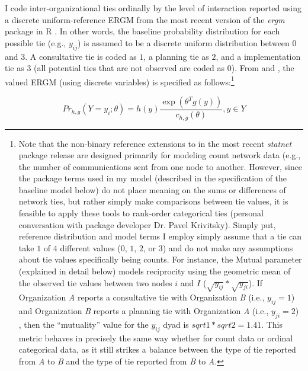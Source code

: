 \documentclass[12pt,a4paper,titlepage]{article}
\begin{document}
I code inter-organizational ties ordinally by the level of interaction reported using a discrete uniform-reference ERGM from the most recent version of the \textit{ergm} package in R \parencite{handcock2014}. In other words, the baseline probability distribution for each possible tie (e.g., $y_{ij}$) is assumed to be a discrete uniform distribution between $0$ and $3$. A consultative tie is coded as $1$, a planning tie as $2$, and a implementation tie as $3$ (all potential ties that are not observed are coded as $0$). From \textcite{krivitsky2012} and \textcite{handcock2014}, the valued ERGM (using discrete variables) is specified as follows:\footnote{Note that the non-binary reference extensions to in the most recent \textit{statnet} package release \parencite{handock2014-a} are designed primarily for modeling count network data (e.g., the number of communications sent from one node to another. However, since the package terms used in my model (described in the specification of the baseline model below) do not place meaning on the sums or differences of network ties, but rather simply make comparisons between tie values, it is feasible to apply these tools to rank-order categorical ties (personal conversation with package developer Dr. Pavel Krivitsky). Simply put, reference distribution and model terms I employ simply assume that a tie can take $1$ of $4$ different values ($0$, $1$, $2$, or $3$) and do not make any assumptions about tie values specifically being counts. For instance, the Mutual parameter (explained in detail below) models reciprocity using the geometric mean of the observed tie values between two nodes $i$ and $I$ ($\sqrt{y_{ij}}* \sqrt{y_{ji}}$). If Organization \textit{A} reports a consultative tie with Organization \textit{B} (i.e., $y_{ij} = 1$) and Organization \textit{B} reports a planning tie with Organization \textit{A} (i.e., $y_{ji} = 2$) , then the ``mutuality'' value for the $y_{ij}$ dyad is $sqrt{1} * sqrt{2} = 1.41$. This metric behaves in precisely the same way whether for count data or ordinal categorical data, as it still strikes a balance between the type of tie reported from \textit{A} to \textit{B} and the type of tie reported from \textit{B} to \textit{A}.}  

\begin{equation}
Pr_{h,g}(Y=y_{i};\theta)= h(y) \frac{\exp(\theta^{T}g(y))}{c_{h,g}(\theta)}, y \in Y
\label{eq:ERGM}
\end{equation}
\end{document}
